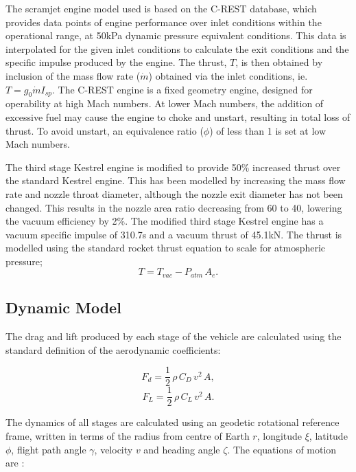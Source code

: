 \documentclass[journal]{new-aiaa}
\begin{document}
The scramjet engine model used is based on the C-REST database\cite{Preller2017}, which provides data points of engine performance over inlet conditions within the operational range, at 50kPa dynamic pressure equivalent conditions. This data is interpolated for the given inlet conditions to calculate the exit conditions and the specific impulse produced by the engine. The thrust, $T$, is then obtained by inclusion of the mass flow rate ($\dot{m}$) obtained via the inlet conditions, ie. $T = g_0\dot{m}I_{sp}$.
The C-REST engine is a fixed geometry engine, designed for operability at high Mach numbers\cite{Preller2017}. At lower Mach numbers, the addition of excessive fuel may cause the engine to choke and unstart, resulting in total loss of thrust\cite{Preller2017}. To avoid unstart, an equivalence ratio ($\phi$) of less than 1 is set at low Mach numbers. 

 The third stage Kestrel engine is modified to provide 50\% increased thrust over the standard Kestrel engine. This has been modelled by increasing the mass flow rate and nozzle throat diameter, although the nozzle exit diameter has not been changed. This results in the nozzle area ratio decreasing from 60\cite{Vehicle2008} to 40, lowering the vacuum efficiency by 2\%\cite{RPE}. The modified third stage Kestrel engine has a vacuum specific impulse of 310.7s\cite{Vehicle2008} and a vacuum thrust of 45.1kN. The thrust is modelled using the standard rocket thrust equation to scale for atmospheric pressure; 
\begin{equation}
T = T_{vac} -P_{atm} \, A_e.
\end{equation}

\subsection{Dynamic Model} \label{section:dynamics}
The drag and lift produced by each stage of the vehicle are calculated using the standard definition of the aerodynamic coefficients:

\begin{equation}
F_d = \frac{1}{2} \, \rho \, C_D \, v^2 \, A ,
\end{equation}
\begin{equation}
F_L = \frac{1}{2} \, \rho \, C_L \, v^2 \, A .
\end{equation}

The dynamics of all stages are calculated using an geodetic rotational reference frame, written in terms of the radius from centre of Earth $r$, longitude $\xi$, latitude $\phi$, flight path angle $\gamma$, velocity $v$ and heading angle $\zeta$. The equations of motion are \cite{Josselyn2002a}:
\end{document}
